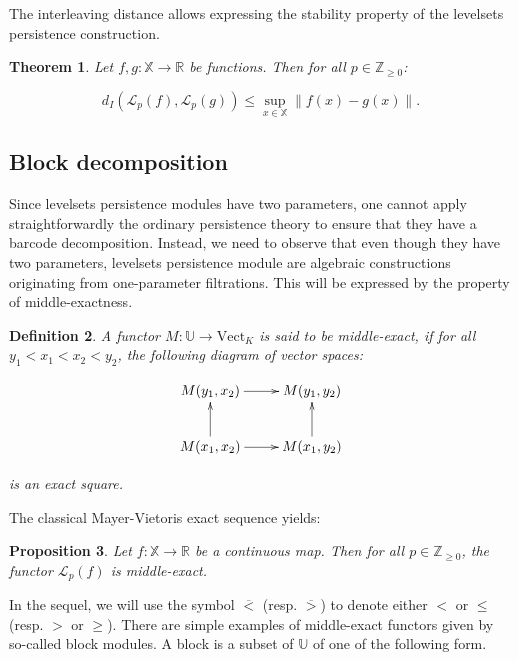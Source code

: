 \documentclass[11pt]{article}
\newtheorem{theorem}{Theorem}[section]
\newtheorem{proposition}[theorem]{Proposition}
\newtheorem{definition}[theorem]{Definition}
\theoremstyle{remark}
\newcommand{\Z}{\mathbb{Z}}
\newcommand{\R}{\mathbb{R}}
\begin{document}
The interleaving distance allows expressing the stability property of the levelsets persistence construction.

\begin{theorem}
Let $f,g : \mathbb{X} \to \R$ be functions. Then for all $p\in \Z_{\geq 0}$:

\[d_I(\mathcal{L}_p(f), \mathcal{L}_p(g)) \leq \sup_{x \in \mathbb{X}} \|f(x) - g(x)\|.\]
\end{theorem}

\subsection{Block decomposition}

Since levelsets persistence modules have two parameters, one cannot apply straightforwardly the ordinary persistence theory  to ensure that they have a barcode decomposition. Instead, we need to observe that even though they have two parameters, levelsets persistence module are algebraic constructions originating from one-parameter filtrations. This will be expressed by the property of middle-exactness.



\begin{definition}
A functor $M : \mathbb{U} \longrightarrow \text{Vect}_K$ is said to be middle-exact, if for all $y_1 < x_1 < x_2 < y_2$, the following diagram of vector spaces:

\[\xymatrix{ M(y_1,x_2) \ar[r] & M(y_1,y_2) \\ 
M(x_1,x_2) \ar[r] \ar[u] & M(x_1, y_2) \ar[u] }\]

is an exact square. 
\end{definition}

The classical Mayer-Vietoris exact sequence yields:

\begin{proposition}
Let $f : \mathbb{X} \longrightarrow \R$ be a continuous map. Then for all $p \in \Z_{\geq 0}$, the functor $\mathcal{L}_p(f)$ is middle-exact.
\end{proposition}


In the sequel, we will use the symbol $\overline{<}$ (resp. $\overline{>}$) to denote either $<$ or $\leq$ (resp. $>$ or $\geq$). There are simple examples of middle-exact functors given by so-called block modules. A block is a subset of $ \mathbb{U}$ of one of the following form.
\end{document}

